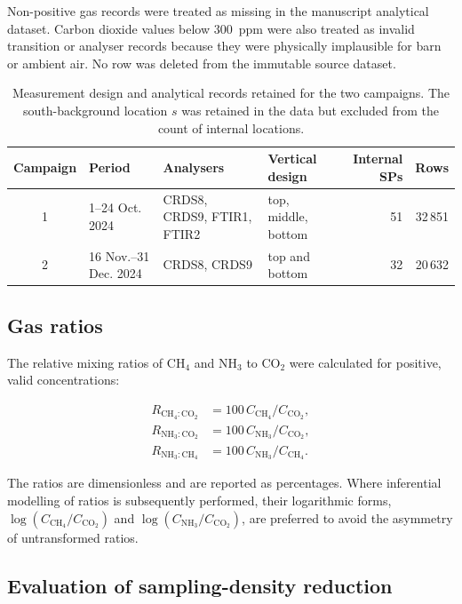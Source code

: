 \documentclass[12pt,a4paper]{article}
\begin{document}
Non-positive gas records were treated as missing in the manuscript analytical
dataset. Carbon dioxide values below \SI{300}{ppm} were also treated as
invalid transition or analyser records because they were physically
implausible for barn or ambient air. No row was deleted from the immutable
source dataset.

\begin{table}[htbp]
\centering
\caption{Measurement design and analytical records retained for the two
campaigns. The south-background location \(s\) was retained in the data but
excluded from the count of internal locations.}
\label{tab:campaigns}
\begingroup
\small
\setlength{\tabcolsep}{2.2pt}
\begin{tabular}{@{}c l
  >{\raggedright\arraybackslash}p{4.0cm}
  >{\raggedright\arraybackslash}p{2.7cm}
  r r@{}}
\toprule
Campaign & Period & Analysers & Vertical design & Internal SPs & Rows\\
\midrule
1 & 1--24 Oct. 2024 & CRDS8, CRDS9, FTIR1, FTIR2 &
top, middle, bottom & 51 & 32\,851\\
2 & 16 Nov.--31 Dec. 2024 & CRDS8, CRDS9 &
top and bottom & 32 & 20\,632\\
\bottomrule
\end{tabular}
\endgroup
\end{table}

\subsection{Gas ratios}

The relative mixing ratios of \(\mathrm{CH_4}\) and \(\mathrm{NH_3}\) to
\(\mathrm{CO_2}\) were calculated for positive, valid concentrations:

\begin{align}
R_{\mathrm{CH_4:CO_2}} &=
100\,C_{\mathrm{CH_4}}/C_{\mathrm{CO_2}},\\
R_{\mathrm{NH_3:CO_2}} &=
100\,C_{\mathrm{NH_3}}/C_{\mathrm{CO_2}},\\
R_{\mathrm{NH_3:CH_4}} &=
100\,C_{\mathrm{NH_3}}/C_{\mathrm{CH_4}}.
\end{align}

The ratios are dimensionless and are reported as percentages. Where
inferential modelling of ratios is subsequently performed, their logarithmic
forms, \(\log(C_{\mathrm{CH_4}}/C_{\mathrm{CO_2}})\) and
\(\log(C_{\mathrm{NH_3}}/C_{\mathrm{CO_2}})\), are preferred to avoid the
asymmetry of untransformed ratios.

\subsection{Evaluation of sampling-density reduction}
\end{document}
